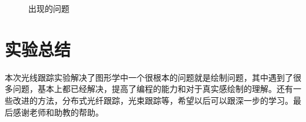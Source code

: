 \documentclass{article}
\begin{document}
\begin{figure}[H]
  \centering%
  \caption{出现的问题}
  \label{fig:err}
\end{figure}
\section{实验总结}
本次光线跟踪实验解决了图形学中一个很根本的问题就是绘制问题，其中遇到了很多问题，基本上都已经解决，提高了编程的能力和对于真实感绘制的理解。还有一些改进的方法，分布式光纤跟踪，光束跟踪等，希望以后可以跟深一步的学习。最后感谢老师和助教的帮助。
\newpage
{}

\end{document}
